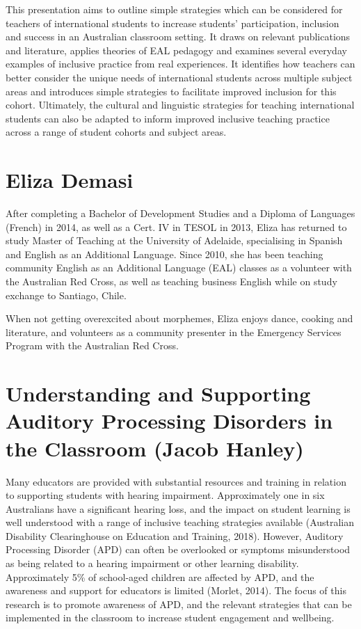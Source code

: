 \documentclass[twoside,12pt,a4paper,notitlepage]{memoir}
\begin{document}
This presentation aims to outline simple strategies which can be considered for teachers of international students to increase students’ participation, inclusion and success in an Australian classroom setting. It draws on relevant publications and literature, applies theories of EAL pedagogy and examines several everyday examples of inclusive practice from real experiences. It identifies how teachers can better consider the unique needs of international students across multiple subject areas and introduces simple strategies to facilitate improved inclusion for this cohort. Ultimately, the cultural and linguistic strategies for teaching international students can also be adapted to inform improved inclusive teaching practice across a range of student cohorts and subject areas.

\section*{Eliza Demasi}

After completing a Bachelor of Development Studies and a Diploma of Languages (French) in 2014, as well as a Cert. IV in TESOL in 2013, Eliza has returned to study Master of Teaching at the University of Adelaide, specialising in Spanish and English as an Additional Language. Since 2010, she has been teaching community English as an Additional Language (EAL) classes as a volunteer with the Australian Red Cross, as well as teaching business English while on study exchange to Santiago, Chile.

When not getting overexcited about morphemes, Eliza enjoys dance, cooking and literature, and volunteers as a community presenter in the Emergency Services Program with the Australian Red Cross.



\pagebreak
\section*{Understanding and Supporting Auditory Processing Disorders in the Classroom (Jacob Hanley)}
\label{aut:hanley}

Many educators are provided with substantial resources and training in relation to supporting students with hearing impairment. Approximately one in six Australians have a significant hearing loss, and the impact on student learning is well understood with a range of inclusive teaching strategies available (Australian Disability Clearinghouse on Education and Training, 2018). However, Auditory Processing Disorder (APD) can often be overlooked or symptoms misunderstood as being related to a hearing impairment or other learning disability. Approximately 5\% of school-aged children are affected by APD, and the awareness and support for educators is limited (Morlet, 2014). The focus of this research is to promote awareness of APD, and the relevant strategies that can be implemented in the classroom to increase student engagement and wellbeing.
\end{document}

